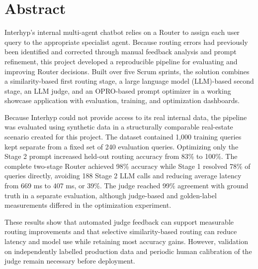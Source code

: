 \clearpage
\section*{Abstract}

Interhyp's internal multi-agent chatbot relies on a Router to assign each user query to the appropriate specialist agent. Because routing errors had previously been identified and corrected through manual feedback analysis and prompt refinement, this project developed a reproducible pipeline for evaluating and improving Router decisions. Built over five Scrum sprints, the solution combines a similarity-based first routing stage, a large language model (LLM)-based second stage, an LLM judge, and an OPRO-based prompt optimizer in a working showcase application with evaluation, training, and optimization dashboards.

Because Interhyp could not provide access to its real internal data, the pipeline was evaluated using synthetic data in a structurally comparable real-estate scenario created for this project. The dataset contained 1,000 training queries kept separate from a fixed set of 240 evaluation queries. Optimizing only the Stage 2 prompt increased held-out routing accuracy from 83\% to 100\%. The complete two-stage Router achieved 98\% accuracy while Stage 1 resolved 78\% of queries directly, avoiding 188 Stage 2 LLM calls and reducing average latency from 669 ms to 407 ms, or 39\%. The judge reached 99\% agreement with ground truth in a separate evaluation, although judge-based and golden-label measurements differed in the optimization experiment.

These results show that automated judge feedback can support measurable routing improvements and that selective similarity-based routing can reduce latency and model use while retaining most accuracy gains. However, validation on independently labelled production data and periodic human calibration of the judge remain necessary before deployment.
